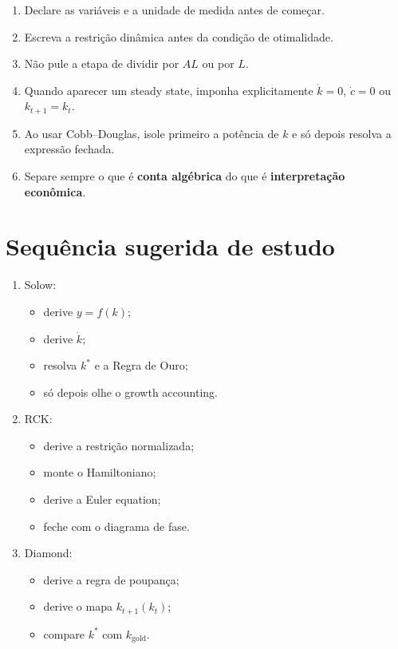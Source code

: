 \documentclass[11pt,a4paper]{article}
\begin{document}
\begin{enumerate}
  \item Declare as vari\'aveis e a unidade de medida antes de come\c{c}ar.
  \item Escreva a restri\c{c}\~ao din\^amica antes da condi\c{c}\~ao de otimalidade.
  \item N\~ao pule a etapa de dividir por \(AL\) ou por \(L\).
  \item Quando aparecer um steady state, imponha explicitamente \(\dot{k}=0\),
  \(\dot{c}=0\) ou \(k_{t+1}=k_t\).
  \item Ao usar Cobb--Douglas, isole primeiro a pot\^encia de \(k\) e s\'o depois
  resolva a express\~ao fechada.
  \item Separe sempre o que \'e \textbf{conta alg\'ebrica} do que \'e
  \textbf{interpreta\c{c}\~ao econ\^omica}.
\end{enumerate}

\section{Sequ\^encia sugerida de estudo}

\begin{enumerate}
  \item Solow:
  \begin{itemize}
    \item derive \(y=f(k)\);
    \item derive \(\dot{k}\);
    \item resolva \(k^\ast\) e a Regra de Ouro;
    \item s\'o depois olhe o growth accounting.
  \end{itemize}
  \item RCK:
  \begin{itemize}
    \item derive a restri\c{c}\~ao normalizada;
    \item monte o Hamiltoniano;
    \item derive a Euler equation;
    \item feche com o diagrama de fase.
  \end{itemize}
  \item Diamond:
  \begin{itemize}
    \item derive a regra de poupan\c{c}a;
    \item derive o mapa \(k_{t+1}(k_t)\);
    \item compare \(k^\ast\) com \(k_{\text{gold}}\).
  \end{itemize}
\end{enumerate}
\end{document}
